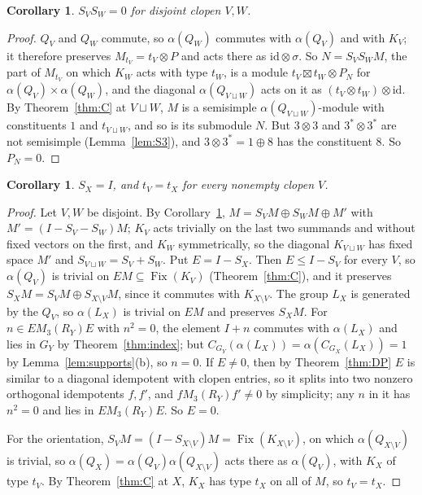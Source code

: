 \documentclass[11pt]{amsart}
\newtheorem{corollary}[theorem]{Corollary}
\theoremstyle{remark}
\newcommand{\Fix}{\operatorname{Fix}}
\begin{document}
\begin{corollary}\label{cor:O}
$S_VS_W=0$ for disjoint clopen $V,W$.
\end{corollary}

\begin{proof}
$Q_V$ and $Q_W$ commute, so $\alpha(Q_W)$ commutes with $\alpha(Q_V)$ and
with $K_V$; it therefore preserves $M_{t_V}=t_V\otimes P$ and acts there as
$\mathrm{id}\otimes\sigma$. So $N=S_VS_WM$, the part of $M_{t_V}$ on which
$K_W$ acts with type $t_W$, is a module $t_V\boxtimes t_W\otimes P_N$ for
$\alpha(Q_V)\times\alpha(Q_W)$, and the diagonal $\alpha(Q_{V\sqcup W})$ acts
on it as $(t_V\otimes t_W)\otimes\mathrm{id}$. By Theorem~\ref{thm:C} at
$V\sqcup W$, $M$ is a semisimple $\alpha(Q_{V\sqcup W})$-module with
constituents $1$ and $t_{V\sqcup W}$, and so is its submodule $N$. But
$3\otimes3$ and $3^*\otimes3^*$ are not semisimple (Lemma~\ref{lem:S3}),
and $3\otimes3^*=1\oplus8$ has the constituent $8$. So $P_N=0$.
\end{proof}

\begin{corollary}\label{cor:Oprime}
$S_X=I$, and $t_V=t_X$ for every nonempty clopen $V$.
\end{corollary}

\begin{proof}
Let $V,W$ be disjoint. By Corollary~\ref{cor:O}, $M=S_VM\oplus S_WM\oplus M'$
with $M'=(I-S_V-S_W)M$; $K_V$ acts trivially on the last two summands and
without fixed vectors on the first, and $K_W$ symmetrically, so the diagonal
$K_{V\sqcup W}$ has fixed space $M'$ and $S_{V\sqcup W}=S_V+S_W$. Put
$E=I-S_X$. Then $E\le I-S_V$ for every $V$, so $\alpha(Q_V)$ is trivial on
$EM\subseteq\Fix(K_V)$ (Theorem~\ref{thm:C}), and it preserves
$S_XM=S_VM\oplus S_{X\setminus V}M$, since it commutes with $K_{X\setminus V}$.
The group $L_X$ is generated by the $Q_V$, so $\alpha(L_X)$ is trivial on
$EM$ and preserves $S_XM$. For $n\in EM_3(R_Y)E$ with $n^2=0$, the element
$I+n$ commutes with $\alpha(L_X)$ and lies in $G_Y$ by
Theorem~\ref{thm:index}; but $C_{G_Y}(\alpha(L_X))=\alpha(C_{G_X}(L_X))=1$
by Lemma~\ref{lem:supports}(b), so $n=0$. If $E\ne0$, then by
Theorem~\ref{thm:DP} $E$ is similar to a diagonal idempotent with clopen
entries, so it splits into two nonzero orthogonal idempotents $f,f'$, and
$fM_3(R_Y)f'\ne0$ by simplicity; any $n$ in it has $n^2=0$ and lies in
$EM_3(R_Y)E$. So $E=0$.

For the orientation, $S_VM=(I-S_{X\setminus V})M=\Fix(K_{X\setminus V})$,
on which $\alpha(Q_{X\setminus V})$ is trivial, so $\alpha(Q_X)=\alpha(Q_V)\alpha(Q_{X\setminus V})$
acts there as $\alpha(Q_V)$, with $K_X$ of type $t_V$. By
Theorem~\ref{thm:C} at $X$, $K_X$ has type $t_X$ on all of $M$, so
$t_V=t_X$.
\end{proof}
\end{document}
